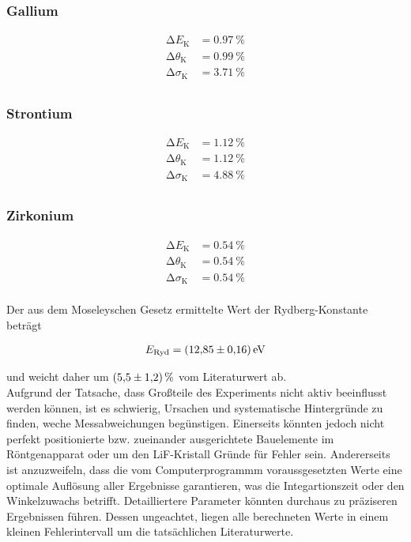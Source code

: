 \subsubsection{Gallium}

\begin{align*}
    \increment{}E_\text{K} &= \qty{0.97}{\percent} \\
    \increment{}\theta_\text{K} &= \qty{0.99}{\percent} \\ 
    \increment{}\sigma_\text{K} &= \qty{3.71}{\percent} \\
\end{align*}

\subsubsection{Strontium}

\begin{align*}
    \increment{}E_\text{K} &= \qty{1.12}{\percent} \\
    \increment{}\theta_\text{K} &= \qty{1.12}{\percent} \\ 
    \increment{}\sigma_\text{K} &= \qty{4.88}{\percent} \\
\end{align*}

\subsubsection{Zirkonium}

\begin{align*}
    \increment{}E_\text{K} &= \qty{0.54}{\percent} \\
    \increment{}\theta_\text{K} &= \qty{0.54}{\percent} \\ 
    \increment{}\sigma_\text{K} &= \qty{0.54}{\percent} \\
\end{align*}

\noindent Der aus dem Moseleyschen Gesetz ermittelte Wert der Rydberg-Konstante beträgt 

\begin{align*}
    E_\text{Ryd}  =\qty{12.85\pm0.16}{\electronvolt}
\end{align*}

\noindent und weicht daher um $\qty{5.5\pm1.2}{\percent}$ vom Literaturwert ab.\\

\noindent Aufgrund der Tatsache, dass Großteile des Experiments nicht aktiv beeinflusst werden können, ist es schwierig, Ursachen 
und systematische Hintergründe zu finden, weche Messabweichungen begünstigen. Einerseits könnten jedoch nicht perfekt positionierte bzw. 
zueinander ausgerichtete Bauelemente im Röntgenapparat oder um den LiF-Kristall Gründe für Fehler sein. Andererseits ist anzuzweifeln, 
dass die vom Computerprogrammm voraussgesetzten Werte eine optimale Auflösung aller Ergebnisse garantieren, was die Integartionszeit oder 
den Winkelzuwachs betrifft. Detailliertere Parameter könnten durchaus zu präziseren Ergebnissen führen. Dessen ungeachtet, liegen 
alle berechneten Werte in einem kleinen Fehlerintervall um die tatsächlichen Literaturwerte.


%




